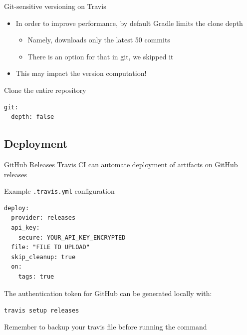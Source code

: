 \documentclass[presentation]{beamer}
\begin{document}
\begin{frame}[fragile]{Git-sensitive versioning on Travis}
    \begin{itemize}
        \item In order to improve performance, by default Gradle limits the clone depth
        \begin{itemize}
            \item Namely, downloads only the latest 50 commits
            \item There is an option for that in git, we skipped it
        \end{itemize}
        \item This may impact the version computation!
    \end{itemize}
    \begin{block}{Clone the entire repository}
        \begin{verbatim}
git:
  depth: false
        \end{verbatim}
    \end{block}
\end{frame}

\subsection{Deployment}

\begin{frame}[fragile]{GitHub Releases}
    Travis CI can automate deployment of artifacts on GitHub releases
    \begin{block}{Example \texttt{.travis.yml} configuration}
        \begin{verbatim}
deploy:
  provider: releases
  api_key:
    secure: YOUR_API_KEY_ENCRYPTED
  file: "FILE TO UPLOAD"
  skip_cleanup: true
  on:
    tags: true
        \end{verbatim}
    \end{block}
    The authentication token for GitHub can be generated locally with:
    
    \texttt{travis setup releases}
    
    Remember to backup your travis file before running the command
\end{frame}
\end{document}

